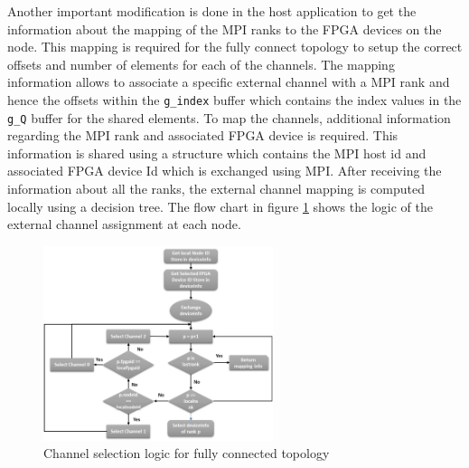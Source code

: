 Another important modification is done in the host application to get the information about
the mapping of the MPI ranks to the FPGA devices on the node. This mapping is required for the
fully connect topology to setup the correct offsets and number of elements for each of the channels.
The mapping information allows to associate a specific external channel with a MPI rank and hence the
offsets within the \texttt{g\_index} buffer which contains the index values in the \texttt{g\_Q}
buffer for the shared elements. To map the channels, additional information
regarding the MPI rank and associated FPGA device is required. This information is shared using
a structure which contains the MPI host id and associated FPGA device Id which is exchanged
using MPI. After receiving the information about all the ranks, the external channel mapping
is computed locally using a decision tree. The flow chart in figure \ref{fig:channel_select}
shows the logic of the external channel assignment at each node.

\begin{figure}[h]%
    \centering
    \includegraphics[width=0.6\textwidth]{images/channel_select}
    \caption{Channel selection logic for fully connected topology}
    \label{fig:channel_select}
\end{figure}

